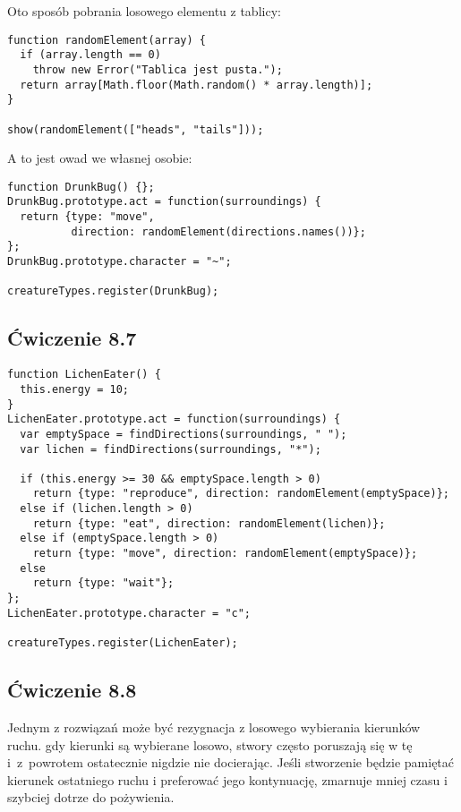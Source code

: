 Oto sposób pobrania losowego elementu z tablicy:
    
\begin{verbatim} 
function randomElement(array) {
  if (array.length == 0)
    throw new Error("Tablica jest pusta.");
  return array[Math.floor(Math.random() * array.length)];
}

show(randomElement(["heads", "tails"]));
 \end{verbatim}
    
A to jest owad we własnej osobie:
    
\begin{verbatim} 
function DrunkBug() {};
DrunkBug.prototype.act = function(surroundings) {
  return {type: "move",
          direction: randomElement(directions.names())};
};
DrunkBug.prototype.character = "~";

creatureTypes.register(DrunkBug);
\end{verbatim}

  
\subsection*{Ćwiczenie 8.7}
\label{sol:8.7}
     
\begin{verbatim} 
function LichenEater() {
  this.energy = 10;
}
LichenEater.prototype.act = function(surroundings) {
  var emptySpace = findDirections(surroundings, " ");
  var lichen = findDirections(surroundings, "*");

  if (this.energy >= 30 && emptySpace.length > 0)
    return {type: "reproduce", direction: randomElement(emptySpace)};
  else if (lichen.length > 0)
    return {type: "eat", direction: randomElement(lichen)};
  else if (emptySpace.length > 0)
    return {type: "move", direction: randomElement(emptySpace)};
  else
    return {type: "wait"};
};
LichenEater.prototype.character = "c";

creatureTypes.register(LichenEater);
\end{verbatim}

  
\subsection*{Ćwiczenie 8.8}
\label{sol:8.8}
    
Jednym z rozwiązań może być rezygnacja z losowego wybierania kierunków ruchu. gdy kierunki są wybierane losowo, stwory często poruszają się w tę i~z~powrotem ostatecznie nigdzie nie docierając. Jeśli stworzenie będzie pamiętać kierunek ostatniego ruchu i preferować jego kontynuację, zmarnuje mniej czasu i szybciej dotrze do pożywienia.

